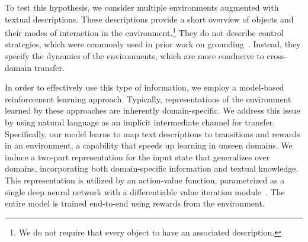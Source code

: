 
To test this hypothesis, we consider multiple environments augmented with textual descriptions. 
These descriptions provide a short overview of objects and their modes of interaction in the environment.\footnote{We do not require that every object to have an associated description.} They do not describe control strategies, which were commonly used in prior work on grounding~. Instead, they specify the dynamics of the environments, which are more conducive to cross-domain transfer.




In order to effectively use this type of information, we employ a model-based reinforcement learning approach. Typically, representations of the environment learned by these approaches are inherently domain-specific. We address this issue by using natural language as an implicit intermediate channel for transfer. Specifically, our model learns to map text descriptions to transitions and rewards in an environment, a capability that speeds up learning in unseen domains. We induce a two-part representation for the input state that generalizes over domains, incorporating both domain-specific information and textual knowledge. This representation is utilized by an action-value function, parametrized as a single deep neural network with a differentiable value iteration module~. The entire model is trained end-to-end using rewards from the environment. 


